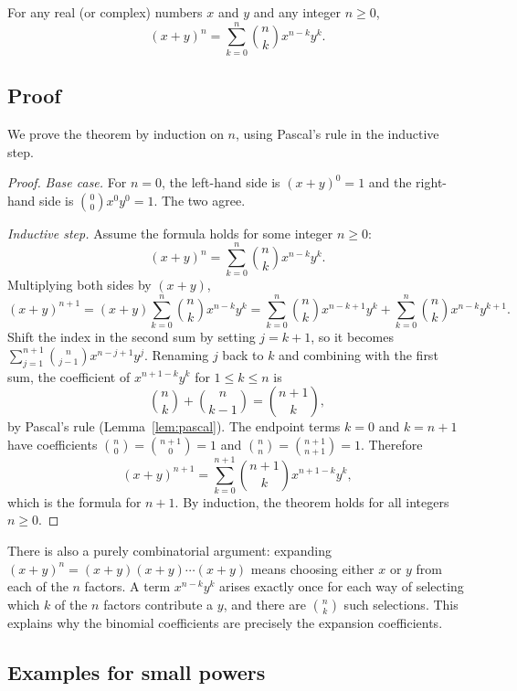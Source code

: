 \begin{theorem}\label{thm:binomial}
For any real (or complex) numbers $x$ and $y$ and any integer $n \geq 0$,
\[
(x + y)^n = \sum_{k=0}^{n} \binom{n}{k} x^{n-k} y^{k}.
\]
\end{theorem}

\subsection{Proof}

We prove the theorem by induction on $n$, using Pascal's rule in the inductive step.

\begin{proof}
\emph{Base case.} For $n = 0$, the left-hand side is $(x+y)^0 = 1$ and the right-hand side is $\binom{0}{0} x^0 y^0 = 1$. The two agree.

\emph{Inductive step.} Assume the formula holds for some integer $n \geq 0$:
\[
(x + y)^n = \sum_{k=0}^{n} \binom{n}{k} x^{n-k} y^{k}.
\]
Multiplying both sides by $(x + y)$,
\[
(x + y)^{n+1} = (x + y)\sum_{k=0}^{n} \binom{n}{k} x^{n-k} y^{k}
= \sum_{k=0}^{n} \binom{n}{k} x^{n-k+1} y^{k} + \sum_{k=0}^{n} \binom{n}{k} x^{n-k} y^{k+1}.
\]
Shift the index in the second sum by setting $j = k+1$, so it becomes $\sum_{j=1}^{n+1} \binom{n}{j-1} x^{n-j+1} y^{j}$. Renaming $j$ back to $k$ and combining with the first sum, the coefficient of $x^{n+1-k} y^{k}$ for $1 \leq k \leq n$ is
\[
\binom{n}{k} + \binom{n}{k-1} = \binom{n+1}{k},
\]
by Pascal's rule (Lemma~\ref{lem:pascal}). The endpoint terms $k = 0$ and $k = n+1$ have coefficients $\binom{n}{0} = \binom{n+1}{0} = 1$ and $\binom{n}{n} = \binom{n+1}{n+1} = 1$. Therefore
\[
(x + y)^{n+1} = \sum_{k=0}^{n+1} \binom{n+1}{k} x^{n+1-k} y^{k},
\]
which is the formula for $n+1$. By induction, the theorem holds for all integers $n \geq 0$.
\end{proof}

\begin{remark}
There is also a purely combinatorial argument: expanding $(x+y)^n = (x+y)(x+y)\cdots(x+y)$ means choosing either $x$ or $y$ from each of the $n$ factors. A term $x^{n-k} y^{k}$ arises exactly once for each way of selecting which $k$ of the $n$ factors contribute a $y$, and there are $\binom{n}{k}$ such selections. This explains why the binomial coefficients are precisely the expansion coefficients.
\end{remark}

\subsection{Examples for small powers}


